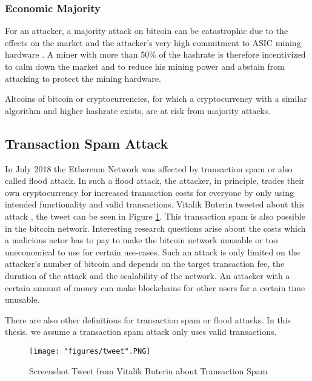 \subsubsection{Economic Majority\label{subsubsection:economicMajority}}
For an attacker, a majority attack on bitcoin can be catastrophic due to the effects on the market and the attacker's very high commitment to ASIC mining hardware \cite{economicMajority}. A miner with more than 50\% of the hashrate is therefore incentivized to calm down the market and to reduce his mining power and abstain from attacking to protect the mining hardware.

Altcoins of bitcoin or cryptocurrencies, for which a cryptocurrency with a similar algorithm and higher hashrate exists, are at risk from majority attacks.

\subsection{Transaction Spam Attack}
In July 2018 the Ethereum Network was affected by transaction spam or also called flood attack. In such a flood attack, the attacker, in principle, trades their own cryptocurrency for increased transaction costs for everyone by only using intended functionality and valid transactions. Vitalik Buterin tweeted about this attack \cite{tweet}, the tweet can be seen in Figure \ref{fig:transactionSpam}. This transaction spam is also possible in the bitcoin network. Interesting research questions arise about the costs which a malicious actor has to pay to make the bitcoin network unusable or too uneconomical to use for certain use-cases. Such an attack is only limited on the attacker's number of bitcoin and depends on the target transaction fee, the duration of the attack and the scalability of the network. An attacker with a certain amount of money can make blockchains for other users for a certain time unusable.

There are also other definitions for transaction spam or flood attacks. In this thesis, we assume a transaction spam attack only uses valid transactions.

\begin{figure}[!htb]
\centering
\texttt{[image: "figures/tweet".PNG]}
\caption{Screenshot Tweet from Vitalik Buterin about Transaction Spam
\label{fig:transactionSpam}}
\end{figure}